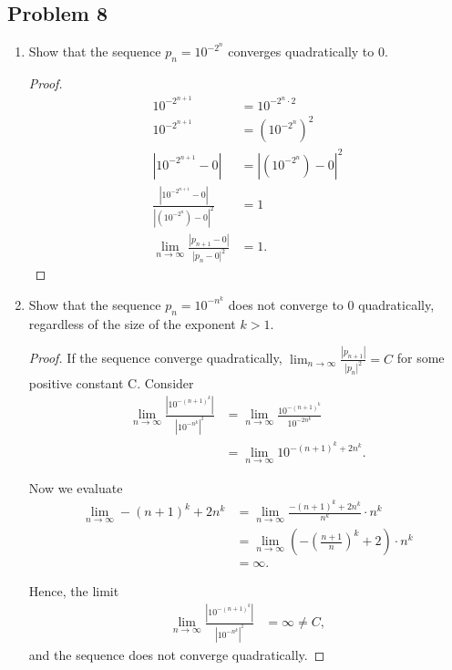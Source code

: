 \documentclass{article}
\begin{document}
\subsection*{Problem 8}
\begin{enumerate}[label=\alph*.]
    \item Show that the sequence $p_n = 10^{-2^n}$ converges quadratically to 0.
    \begin{proof}
        \begin{align*}
            10^{-2^{n+1}} & = 10^{-2^n \cdot 2} \\
            10^{-2^{n+1}} & = \left(10^{-2^n}\right)^2 \\
            |10^{-2^{n+1}}-0| & = |\left(10^{-2^n}\right)-0|^2 \\
            \frac{|10^{-2^{n+1}}-0|}{|\left(10^{-2^n}\right)-0|^2} & = 1 \\
            \lim_{n\rightarrow\infty}\frac{|p_{n+1}-0|}{|p_n-0|^2} & = 1.
        \end{align*}
    \end{proof}
    \item Show that the sequence $p_n = 10^{-n^k}$ does not converge to 0 quadratically, regardless 
    of the size of the exponent $k > 1$.
    \begin{proof}
        If the sequence converge quadratically, $\lim_{n\rightarrow\infty}\frac{|p_{n+1}|}{|p_n|^2} 
        = C$ for some positive constant C. Consider
        \begin{align*}
            \lim_{n\rightarrow\infty}\frac{|10^{-(n+1)^k}|}{|10^{-n^k}|^{^2}} & = 
            \lim_{n\rightarrow\infty}\frac{10^{-(n+1)^k}}{10^{-2n^k}} \\
            & = \lim_{n\rightarrow\infty}10^{-(n+1)^k+2n^k}.
        \end{align*}

        Now we evaluate 
        \begin{align*}
            \lim_{n\rightarrow\infty}-(n+1)^k+2n^k & = 
            \lim_{n\rightarrow\infty}\frac{-(n+1)^k+2n^k}{n^k}\cdot n^k \\
            & = \lim_{n\rightarrow\infty}\left(-\left(\frac{n+1}{n}\right)^k + 2\right)\cdot n^k \\
            & = \infty.
        \end{align*}

        Hence, the limit
        \begin{align*}
            \lim_{n\rightarrow\infty}\frac{|10^{-(n+1)^k}|}{|10^{-n^k}|^{^2}} & = \infty \neq C,
        \end{align*}
        and the sequence does not converge quadratically.
    \end{proof}
\end{enumerate}
\end{document}
